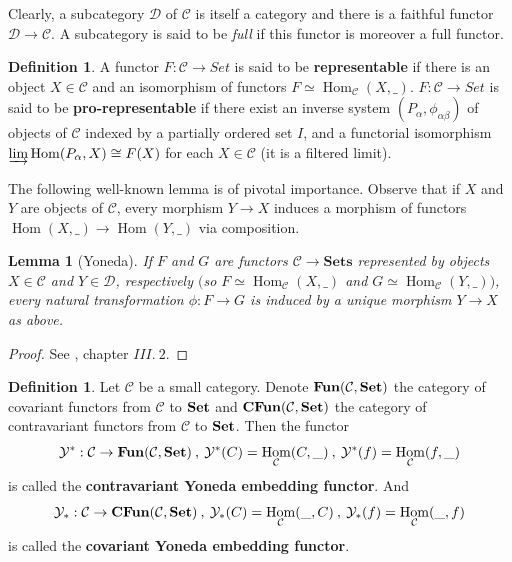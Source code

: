 \documentclass{article}
\theoremstyle{plain}
\newtheorem{lemma}[theorem]{Lemma}
\theoremstyle{definition}
\newtheorem{definition}[theorem]{Definition}
\DeclareMathOperator{\Hom}{Hom}
\DeclareMathOperator{\SET}{\bf{Set}}
\DeclareMathOperator{\Fun}{\bf{Fun}}
\DeclareMathOperator{\CFun}{\bf{CFun}}
\begin{document}
\noindent Clearly, a subcategory $\mathcal{D}$ of $\mathcal{C}$ is itself a category and there is a faithful functor $\mathcal{D}\rightarrow\mathcal{C}$. 
A subcategory is said to be \textit{full} if this functor is moreover a full functor.

\begin{definition}
\label{(pro)_representable}
    A functor $F:\mathcal{C}\rightarrow Set$ is said to be \textbf{representable} if there is an object $X\in\mathcal{C}$ and an isomorphism of functors $F\simeq \Hom_{\mathcal{C}}(X,\_)$. 
    $F: \mathcal{C} \rightarrow Set$ is said to be \textbf{pro-representable} if there exist an inverse system $(P_\alpha, \phi_{\alpha\beta})$ of objects of $\mathcal{C}$ indexed by a partially ordered set $I$, and a functorial isomorphism $\varinjlim \Hom (P_\alpha, X) \cong F(X)$ for each $X\in \mathcal{C}$ (it is a filtered limit).
\end{definition}


    


\noindent The following well-known lemma is of pivotal importance. Observe that if $X$ and $Y$ are objects of $\mathcal{C}$, every morphism $Y \rightarrow X$ induces a morphism of
functors $\Hom(X,\_) \rightarrow \Hom(Y,\_)$ via composition.

\begin{lemma}[Yoneda]
    If $F$ and $G$ are functors $\mathcal{C}\rightarrow \textbf{Sets}$ represented by objects $X\in\mathcal{C}$ and $Y\in\mathcal{D}$, respectively $($so $F\simeq \Hom_{\mathcal{C}}(X,\_)$ and $G\simeq \Hom_{\mathcal{C}}(Y,\_))$, every natural transformation $\phi : F \rightarrow G$ is induced by a unique morphism $Y \rightarrow X$ as above.
\end{lemma}
\begin{proof}
    See \cite{McLane_Sau}, chapter $III. \: 2.$
\end{proof}

\begin{definition}
    Let $\mathcal{C}$ be a small category. Denote $\Fun(\mathcal{C},\SET)$ the category of covariant functors from $\mathcal{C}$ to $\SET$ and $\CFun(\mathcal{C},\SET)$ the category of contravariant functors from $\mathcal{C}$ to $\SET$. Then the functor
    $$\mathcal{Y}^* : \mathcal{C}\rightarrow \Fun(\mathcal{C},\SET) \:, \: \mathcal{Y}^*(C) = \Hom_{\mathcal{C}}(C, \_) \: , \: \mathcal{Y}^*(f) = \Hom_{\mathcal{C}}(f,\_)$$
    is called the \textbf{contravariant Yoneda embedding functor}. And
    $$\mathcal{Y}_* : \mathcal{C}\rightarrow \CFun(\mathcal{C},\SET) \:, \: \mathcal{Y}_*(C) = \Hom_{\mathcal{C}}(\_,C) \: , \: \mathcal{Y}_*(f) = \Hom_{\mathcal{C}}(\_,f)$$
    is called the \textbf{covariant Yoneda embedding functor}.
\end{definition}
\end{document}
